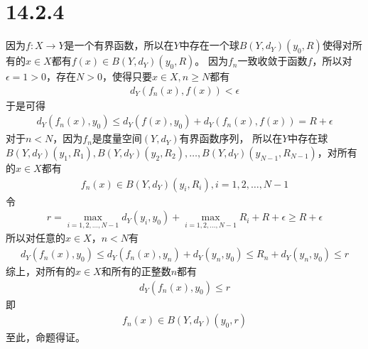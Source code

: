 \documentclass{article}
\begin{document}
\section*{14.2.4}

因为$f: X \to Y$是一个有界函数，所以在$Y$中存在一个球$B(Y,d_Y)(y_0, R)$使得对所有的$x \in X$都有$f(x) \in B(Y,d_Y)(y_0, R)$。
因为$f_n$一致收敛于函数$f$，所以对$\epsilon = 1 > 0$，存在$N > 0$，使得只要$x \in X, n \geq N$都有
\begin{align*}
  d_Y(f_n(x), f(x)) < \epsilon
\end{align*}
于是可得
\begin{align*}
  d_Y(f_n(x), y_0) \leq d_Y(f(x), y_0) + d_Y(f_n(x), f(x)) = R + \epsilon
\end{align*}
对于$n < N$，因为$f_n$是度量空间$(Y, d_Y)$有界函数序列，
所以在$Y$中存在球$B(Y, d_Y)(y_1, R_1), B(Y, d_Y)(y_2, R_2), \dots, B(Y, d_Y)(y_{N - 1}, R_{N - 1})$，对所有的$x \in X$都有
\begin{align*}
  f_n(x) \in B(Y, d_Y)(y_i, R_i), i = 1, 2, \dots, N - 1
\end{align*}
令
\begin{align*}
  r = \max\limits_{i = 1, 2, \dots, N - 1} d_Y(y_i, y_0) + \max\limits_{i = 1, 2, \dots, N - 1} R_i + R + \epsilon \geq R + \epsilon
\end{align*}
所以对任意的$x \in X$，$n < N$有
\begin{align*}
  d_Y(f_n(x), y_0) \leq d_Y(f_n(x), y_n) + d_Y(y_n, y_0) \leq R_n + d_Y(y_n, y_0) \leq r
\end{align*}
综上，对所有的$x \in X$和所有的正整数$n$都有
\begin{align*}
  d_Y(f_n(x), y_0) \leq r
\end{align*}
即
\begin{align*}
  f_n(x) \in B(Y, d_Y)(y_0, r)
\end{align*}
至此，命题得证。
\end{document}
